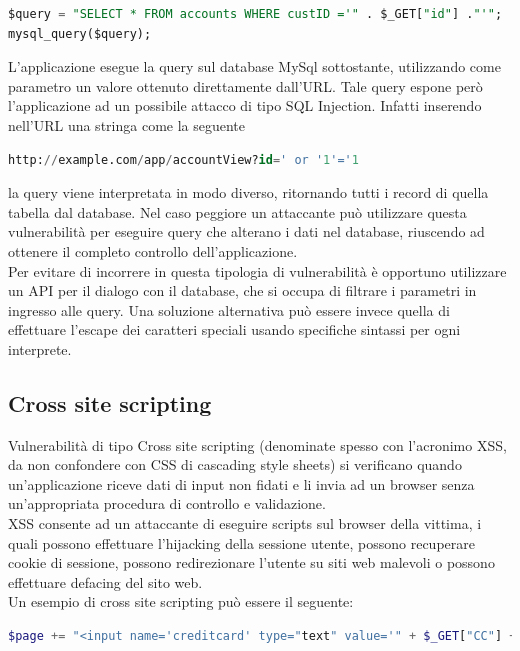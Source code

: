 \begin{lstlisting}[language=SQL]
$query = "SELECT * FROM accounts WHERE custID ='" . $_GET["id"] ."'";
mysql_query($query);
\end{lstlisting}

L'applicazione esegue la query sul database MySql sottostante, utilizzando come parametro un valore ottenuto direttamente dall'URL. Tale query espone però l'applicazione ad un possibile attacco di tipo SQL Injection. Infatti inserendo nell'URL una stringa come la seguente\\

\begin{lstlisting}[language=SQL]
http://example.com/app/accountView?id=' or '1'='1
\end{lstlisting}

la query viene interpretata in modo diverso, ritornando tutti i record di quella tabella dal database. Nel caso peggiore un attaccante può utilizzare questa vulnerabilità per eseguire query che alterano i dati nel database, riuscendo ad ottenere il completo controllo dell'applicazione. \\
Per evitare di incorrere in questa tipologia di vulnerabilità è opportuno utilizzare un API per il dialogo con il database, che si occupa di filtrare i parametri in ingresso alle query. Una soluzione alternativa può essere invece quella di effettuare l'escape dei caratteri speciali usando specifiche sintassi per ogni interprete.

\subsection{Cross site scripting}
Vulnerabilità di tipo Cross site scripting (denominate spesso con l'acronimo XSS, da non confondere con CSS di cascading style sheets) si verificano quando un'applicazione riceve dati di input non fidati e li invia ad un browser senza un'appropriata procedura di controllo e validazione. \\
XSS consente ad un attaccante di eseguire scripts sul browser della vittima, i quali possono effettuare l'hijacking della sessione utente, possono recuperare cookie di sessione, possono redirezionare l'utente su siti web malevoli o possono effettuare defacing del sito web. \\
Un esempio di cross site scripting può essere il seguente:\\

\begin{lstlisting}[language=PHP]
$page += "<input name='creditcard' type="text" value='" + $_GET["CC"] + "'>";
\end{lstlisting}

